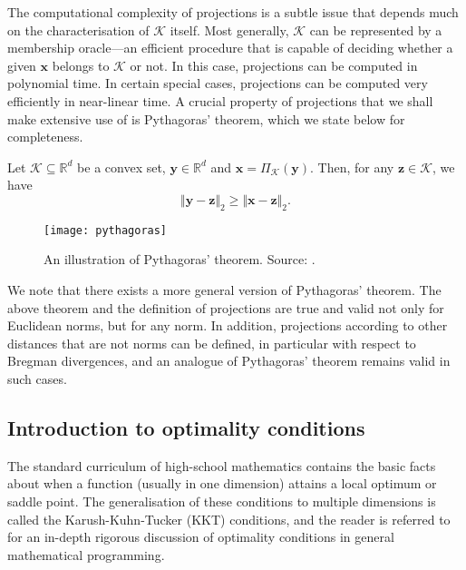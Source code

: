 The computational complexity of projections is a subtle issue that depends much on the characterisation of $\mathcal{K}$ itself. Most generally, $\mathcal{K}$ can be represented by a membership oracle---an efficient procedure that is capable of deciding whether a given $\mathbf{x}$ belongs to $\mathcal{K}$ or not. In this case, projections can be computed in polynomial time. In certain special cases, projections can be computed very efficiently in near-linear time. A crucial property of projections that we shall make extensive use of is Pythagoras' theorem, which we state below for completeness.
\begin{theorem}
  \label{thm:pythagoras}
  Let $\mathcal{K} \subseteq \mathbb{R}^d$ be a convex set, $\mathbf{y} \in \mathbb{R}^d$ and $\mathbf{x} = \Pi_\mathcal{K}(\mathbf{y})$. Then, for any $\mathbf{z} \in \mathcal{K}$, we have
  \begin{equation}
    \Vert \mathbf{y} - \mathbf{z} \Vert_2 \geq \Vert \mathbf{x} - \mathbf{z} \Vert_2.
  \end{equation}
\end{theorem}
\begin{figure}[t]
\centering
\texttt{[image: pythagoras]}
\caption{An illustration of Pythagoras' theorem. Source: \citep{oco}.}
\label{fig:pythagoras}
\end{figure}
We note that there exists a more general version of Pythagoras' theorem. The above theorem and the definition of projections are true and valid not only for Euclidean norms, but for any norm. In addition, projections according to other distances that are not norms can be defined, in particular with respect to Bregman divergences, and an analogue of Pythagoras' theorem remains valid in such cases.

\subsection{Introduction to optimality conditions}

The standard curriculum of high-school mathematics contains the basic facts about when a function (usually in one dimension) attains a local optimum or saddle point. The generalisation of these conditions to multiple dimensions is called the Karush-Kuhn-Tucker (KKT) conditions, and the reader is referred to \cite{nemirovski, rockafellar, fletcher, bv_cvxbook, borwein, bubeck} for an in-depth rigorous discussion of optimality conditions in general mathematical programming.

